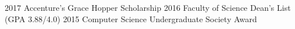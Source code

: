   \begin{cvskills} 
  	\cvskill
		{2017}
		{Accenture's Grace Hopper Scholarship}
	\cvskill
		{2016}
		{Faculty of Science Dean's List (GPA 3.88/4.0)}
	\cvskill
		{2015}
		{Computer Science Undergraduate Society Award}
  \end{cvskills}
